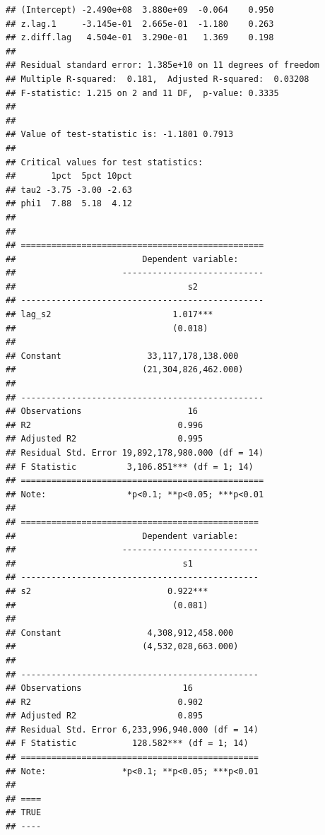 \documentclass[
]{article}
\begin{document}
\begin{verbatim}
## (Intercept) -2.490e+08  3.880e+09  -0.064    0.950
## z.lag.1     -3.145e-01  2.665e-01  -1.180    0.263
## z.diff.lag   4.504e-01  3.290e-01   1.369    0.198
## 
## Residual standard error: 1.385e+10 on 11 degrees of freedom
## Multiple R-squared:  0.181,  Adjusted R-squared:  0.03208 
## F-statistic: 1.215 on 2 and 11 DF,  p-value: 0.3335
## 
## 
## Value of test-statistic is: -1.1801 0.7913 
## 
## Critical values for test statistics: 
##       1pct  5pct 10pct
## tau2 -3.75 -3.00 -2.63
## phi1  7.88  5.18  4.12
## 
## 
## ================================================
##                         Dependent variable:     
##                     ----------------------------
##                                  s2             
## ------------------------------------------------
## lag_s2                        1.017***          
##                               (0.018)           
##                                                 
## Constant                 33,117,178,138.000     
##                         (21,304,826,462.000)    
##                                                 
## ------------------------------------------------
## Observations                     16             
## R2                             0.996            
## Adjusted R2                    0.995            
## Residual Std. Error 19,892,178,980.000 (df = 14)
## F Statistic          3,106.851*** (df = 1; 14)  
## ================================================
## Note:                *p<0.1; **p<0.05; ***p<0.01
## 
## ===============================================
##                         Dependent variable:    
##                     ---------------------------
##                                 s1             
## -----------------------------------------------
## s2                           0.922***          
##                               (0.081)          
##                                                
## Constant                 4,308,912,458.000     
##                         (4,532,028,663.000)    
##                                                
## -----------------------------------------------
## Observations                    16             
## R2                             0.902           
## Adjusted R2                    0.895           
## Residual Std. Error 6,233,996,940.000 (df = 14)
## F Statistic           128.582*** (df = 1; 14)  
## ===============================================
## Note:               *p<0.1; **p<0.05; ***p<0.01
## 
## ====
## TRUE
## ----
\end{verbatim}
\end{document}

